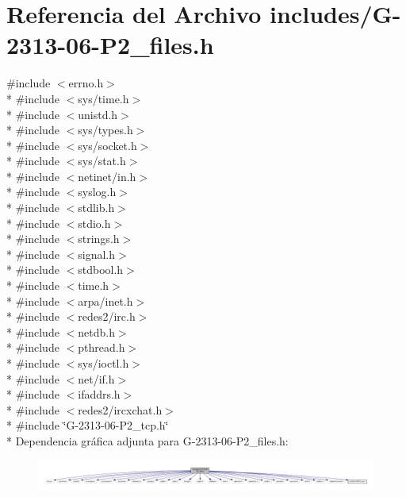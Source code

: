 \hypertarget{G-2313-06-P2__files_8h}{}\section{Referencia del Archivo includes/\+G-\/2313-\/06-\/\+P2\+\_\+files.h}
\label{G-2313-06-P2__files_8h}
{\ttfamily \#include $<$errno.\+h$>$}\\*
{\ttfamily \#include $<$sys/time.\+h$>$}\\*
{\ttfamily \#include $<$unistd.\+h$>$}\\*
{\ttfamily \#include $<$sys/types.\+h$>$}\\*
{\ttfamily \#include $<$sys/socket.\+h$>$}\\*
{\ttfamily \#include $<$sys/stat.\+h$>$}\\*
{\ttfamily \#include $<$netinet/in.\+h$>$}\\*
{\ttfamily \#include $<$syslog.\+h$>$}\\*
{\ttfamily \#include $<$stdlib.\+h$>$}\\*
{\ttfamily \#include $<$stdio.\+h$>$}\\*
{\ttfamily \#include $<$strings.\+h$>$}\\*
{\ttfamily \#include $<$signal.\+h$>$}\\*
{\ttfamily \#include $<$stdbool.\+h$>$}\\*
{\ttfamily \#include $<$time.\+h$>$}\\*
{\ttfamily \#include $<$arpa/inet.\+h$>$}\\*
{\ttfamily \#include $<$redes2/irc.\+h$>$}\\*
{\ttfamily \#include $<$netdb.\+h$>$}\\*
{\ttfamily \#include $<$pthread.\+h$>$}\\*
{\ttfamily \#include $<$sys/ioctl.\+h$>$}\\*
{\ttfamily \#include $<$net/if.\+h$>$}\\*
{\ttfamily \#include $<$ifaddrs.\+h$>$}\\*
{\ttfamily \#include $<$redes2/ircxchat.\+h$>$}\\*
{\ttfamily \#include \char`\"{}G-\/2313-\/06-\/\+P2\+\_\+tcp.\+h\char`\"{}}\\*
Dependencia gráfica adjunta para G-\/2313-\/06-\/\+P2\+\_\+files.h\+:\nopagebreak
\begin{figure}[H]
\begin{center}
\leavevmode
\includegraphics[width=350pt]{G-2313-06-P2__files_8h__incl}
\end{center}
\end{figure}
